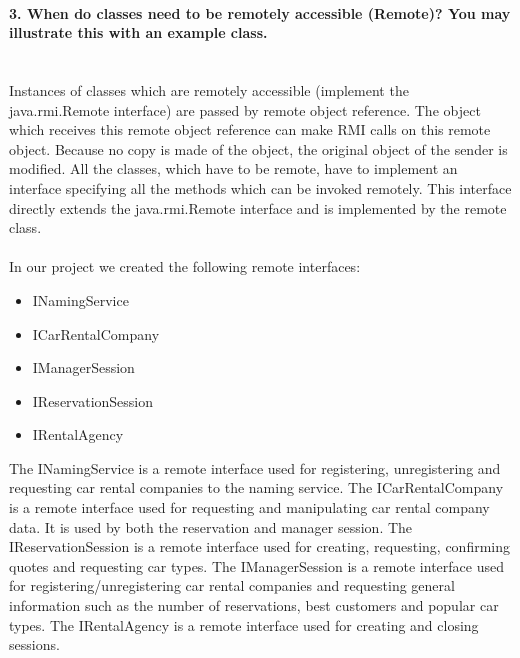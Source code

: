 \documentclass{ds-report}
\begin{document}
	\paragraph{3. When do classes need to be remotely accessible (Remote)? You may illustrate this with an example
class.} \mbox{}\\
Instances of classes which are remotely accessible (implement the java.rmi.Remote interface) are passed by remote object reference. The object which receives this remote object reference can make RMI calls on this remote object. Because no copy is made of the object, the original object of the sender is modified. All the classes, which have to be remote, have to implement an interface specifying all the methods which can be invoked remotely. This interface directly extends the java.rmi.Remote interface and is implemented by the remote class.\\\\
In our project we created the following remote interfaces:
\begin{itemize}
	\item INamingService
	\item ICarRentalCompany
	\item IManagerSession
	\item IReservationSession
	\item IRentalAgency
\end{itemize} 
The INamingService is a remote interface used for registering, unregistering and requesting car rental companies to the naming service. The ICarRentalCompany is a remote interface used for requesting and manipulating car rental company data. It is used by both the reservation and manager session. The IReservationSession is a remote interface used for creating, requesting, confirming quotes and requesting car types. The IManagerSession is a remote interface used for registering/unregistering car rental companies and requesting general information such as the number of reservations, best customers and popular car types. The IRentalAgency is a remote interface used for creating and closing sessions.
\end{document}
